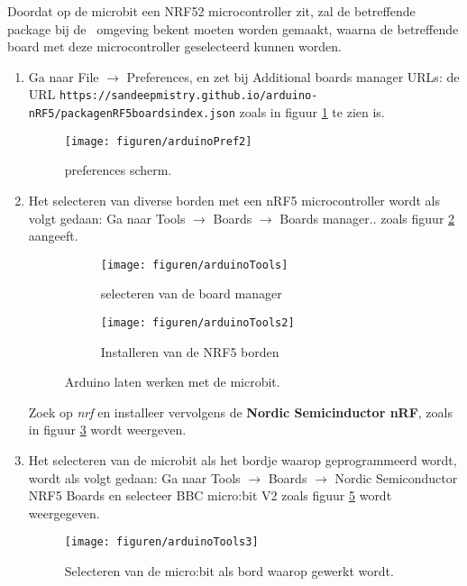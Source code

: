 Doordat op de microbit een NRF52 microcontroller zit, zal de betreffende package bij de \ardIDE ~omgeving bekent moeten worden gemaakt, waarna de betreffende board met deze microcontroller geselecteerd kunnen worden.
\begin{enumerate}
	\item  Ga naar File $\rightarrow$ Preferences, en zet bij Additional boards manager URLs: de URL  %
    {\scriptsize \texttt{https://sandeepmistry.github.io/arduino-nRF5/package\textunderscore nRF5\textunderscore boards\textunderscore index.json}}  zoals in figuur \ref{fig:arduinoPref2} te zien is.\\ 

	\begin{figure}[H]
		\captionsetup{justification=centering}
		\texttt{[image: figuren/arduinoPref2]}
		\centering
		\caption{preferences scherm.}
		\label{fig:arduinoPref2}
	\end{figure}
	
   \item Het selecteren van diverse borden met een nRF5 microcontroller  wordt als volgt gedaan: Ga naar Tools $\rightarrow$ Boards $\rightarrow$ Boards manager.. zoals figuur \ref{fig:ardTool1} aangeeft.
\begin{figure}[h!]
	\centering
	\begin{center} 	
		\begin{subfigure}[b]{0.48\textwidth}
			\texttt{[image: figuren/arduinoTools]}
			\caption{selecteren van de board manager }
			\label{fig:ardTool1}
			
		\end{subfigure}
		\begin{subfigure}[b]{0.48\textwidth}
			\texttt{[image: figuren/arduinoTools2]}
			\caption{Installeren van de NRF5 borden }
			\label{fig:ardTool2}
		\end{subfigure}
		\captionsetup{justification=centering}
		\caption{Arduino laten werken met de microbit. }
		\label{fig:ardTool}
	\end{center}
	
\end{figure}
Zoek op \textit{nrf} en installeer vervolgens de \textbf{Nordic Semicinductor nRF}, zoals in figuur \ref{fig:ardTool2} wordt weergeven.

\item Het selecteren van de microbit als het bordje waarop geprogrammeerd wordt, wordt als volgt gedaan: Ga naar Tools $\rightarrow$ Boards $\rightarrow$ Nordic Semiconductor NRF5 Boards en selecteer BBC micro:bit V2 zoals figuur \ref{fig:ardTool3} wordt weergegeven.
\begin{figure}[H]
	\captionsetup{justification=centering}
	\texttt{[image: figuren/arduinoTools3]}
	\centering
	\caption{Selecteren van de micro:bit als bord waarop gewerkt wordt.}
	\label{fig:ardTool3}
\end{figure}


\end{enumerate}
